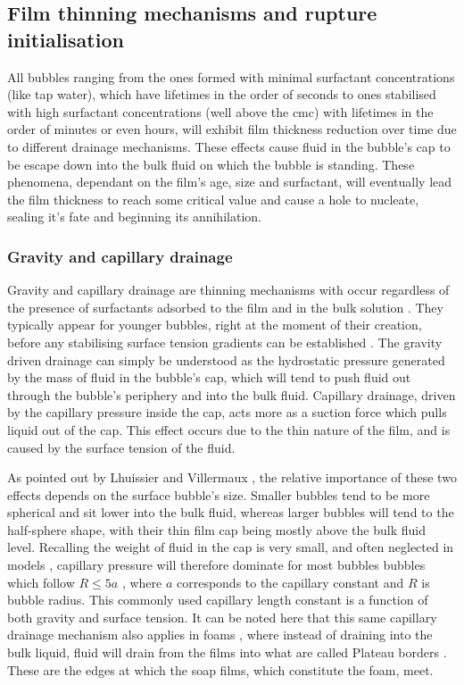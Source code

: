 \documentclass[a4paper,12pt]{article}
\numberwithin{equation}{section}
\numberwithin{figure}{section}
\numberwithin{table}{section}
\begin{document}
\subsection{Film thinning mechanisms and rupture initialisation}
\label{sec:drainage}
All bubbles ranging from the ones formed with minimal surfactant concentrations (like tap water), which have lifetimes in the order of seconds \cite{Zheng1983, Lhuissier2011} to ones stabilised with high surfactant concentrations (well above the cmc) with lifetimes in the order of minutes or even hours, will exhibit film thickness reduction over time due to different drainage mechanisms. These effects cause fluid in the bubble's cap to be escape down into the bulk fluid on which the bubble is standing. These phenomena, dependant on the film's age, size and surfactant, will eventually lead the film thickness to reach some critical value and cause a hole to nucleate, sealing it's fate and beginning its annihilation.

\subsubsection{Gravity and capillary drainage}
\label{sec:GravNCap}
Gravity and capillary drainage are thinning mechanisms with occur regardless of the presence of surfactants adsorbed to the film and in the bulk solution \cite{Lhuissier2011}. They typically appear for younger bubbles, right at the moment of their creation, before any stabilising surface tension gradients can be established \cite{Bhamla2017, Lhuissier2011}. The gravity driven drainage can simply be understood as the hydrostatic pressure generated by the mass of fluid in the bubble's cap, which will tend to push fluid out through the bubble's periphery and into the bulk fluid. Capillary drainage, driven by the capillary pressure inside the cap, acts more as a suction force which pulls liquid out of the cap. This effect occurs due to the thin nature of the film, and is caused by the surface tension of the fluid.

As pointed out by Lhuissier and Villermaux \cite{Lhuissier2011}, the relative importance of these two effects depends on the surface bubble's size. Smaller bubbles tend to be more spherical and sit lower into the bulk fluid, whereas larger bubbles will tend to the half-sphere shape, with their thin film cap being mostly above the bulk fluid level. Recalling the weight of fluid in the cap is very small, and often neglected in models \cite{Ida1998}, capillary pressure will therefore dominate for most bubbles bubbles which follow $R	\leq 5a$ \cite{Lhuissier2011}, where $a$ corresponds to the capillary constant and $R$ is bubble radius. This commonly used capillary length constant is a function of both gravity and surface tension. It can be noted here that this same capillary drainage mechanism also applies in foams \cite{Braun2002}, where instead of draining into the bulk liquid, fluid will drain from the films into what are called Plateau borders \cite{Almgren1976}. These are the edges at which the soap films, which constitute the foam, meet.
\end{document}
